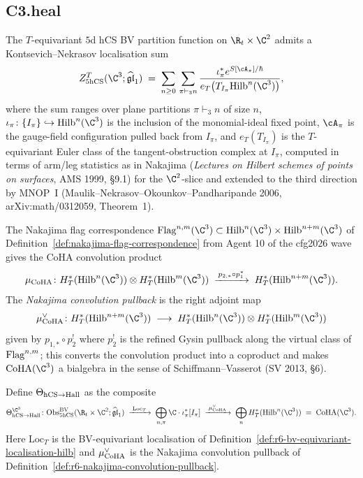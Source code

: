 \subsection*{C3.heal}

\begin{definition}
\label{def:r6-bv-equivariant-localisation-hilb}
The $T$-equivariant $5$d hCS BV partition function on $\R_t\times\C^2$
admits a Kontsevich--Nekrasov localisation sum
\[
Z^T_{5\hCS}(\C^3;\ghat)
\;=\;
\sum_{n\geq 0}\,
\sum_{\pi\vdash_3 n}
\frac{\iota_\pi^* e^{S[\cA_\pi]/\hbar}}
{e_T\bigl(T_{I_\pi}\Hilb^n(\C^3)\bigr)},
\]
where the sum ranges over plane partitions $\pi\vdash_3 n$ of size $n$,
$\iota_\pi\colon\{I_\pi\}\hookrightarrow\Hilb^n(\C^3)$ is the inclusion
of the monomial-ideal fixed point, $\cA_\pi$ is the gauge-field
configuration pulled back from $I_\pi$, and $e_T(T_{I_\pi})$ is the
$T$-equivariant Euler class of the tangent-obstruction complex at
$I_\pi$, computed in terms of arm/leg statistics as in Nakajima
(\emph{Lectures on Hilbert schemes of points on surfaces}, AMS 1999,
\S 9.1) for the $\C^2$-slice and extended to the third direction by
MNOP~I (Maulik--Nekrasov--Okounkov--Pandharipande 2006,
arXiv:math/0312059, Theorem~1).
\end{definition}

\begin{definition}
\label{def:r6-nakajima-convolution-pullback}
The Nakajima flag correspondence
$\Flag^{n,m}(\C^3)\subset\Hilb^n(\C^3)\times\Hilb^{n+m}(\C^3)$ of
Definition~\ref{def:nakajima-flag-correspondence} from Agent 10 of the
cfg2026 wave gives the CoHA convolution product
\[
\mu_{\CoHA}\colon
H^*_T(\Hilb^n(\C^3))\otimes H^*_T(\Hilb^m(\C^3))
\;\xrightarrow{\,p_{2,*}\circ p_1^*\,}\;
H^*_T(\Hilb^{n+m}(\C^3)).
\]
The \emph{Nakajima convolution pullback} is the right adjoint map
\[
\mu_{\CoHA}^\vee\colon
H^*_T(\Hilb^{n+m}(\C^3))
\;\longrightarrow\;
H^*_T(\Hilb^n(\C^3))\otimes H^*_T(\Hilb^m(\C^3))
\]
given by $p_{1,*}\circ p_2^!$ where $p_2^!$ is the refined Gysin pullback
along the virtual class of $\mathrm{Flag}^{n,m}$; this converts the convolution
product into a coproduct and makes $\CoHA(\C^3)$ a bialgebra in the
sense of Schiffmann--Vasserot (SV 2013, \S 6).
\end{definition}

\begin{construction}
\label{con:r6-theta-hcs-hall-explicit-c3}
Define $\Theta_{\mathrm{hCS}\to\mathrm{Hall}}$ as the composite
\[
\Theta_{\hCS\to\Hall}^{\C^3}
\colon
\Obs^{\BV}_{5\hCS}(\R_t\times\C^2;\ghat)
\;\xrightarrow{\;\mathrm{Loc}_T\;}\;
\bigoplus_{n,\pi}\C\cdot\iota_\pi^*[I_\pi]
\;\xrightarrow{\;\mu_{\CoHA}^\vee\;}\;
\bigoplus_n H^*_T(\Hilb^n(\C^3))
\;=\;\CoHA(\C^3).
\]
Here $\mathrm{Loc}_T$ is the BV-equivariant localisation of
Definition~\ref{def:r6-bv-equivariant-localisation-hilb} and
$\mu_{\mathrm{CoHA}}^\vee$ is the Nakajima convolution pullback of
Definition~\ref{def:r6-nakajima-convolution-pullback}.
\end{construction}

